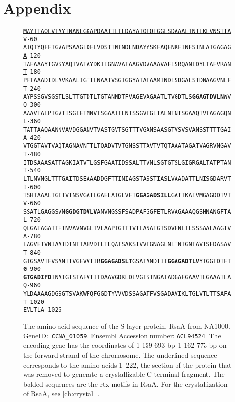 \chapter*{Appendix}
\begin{figure}[p]
  	\begin{center}
\label{app:rsaseq}
\texttt{\singlespacing\small\underline{MAYTTAQLVTAYTNANLGKAPDAATTLTLDAYATQTQTGGLSDAAALTNTLKLVNSTTAV}\hfill-60~~\\
\underline{AIQTYQFFTGVAPSAAGLDFLVDSTTNTNDLNDAYYSKFAQENRFINFSINLATGAGAGA}\hfill-120~\\
\underline{TAFAAAYTGVSYAQTVATAYDKIIGNAVATAAGVDVAAAVAFLSRQANIDYLTAFVRANT}\hfill-180~\\
\underline{PFTAAADIDLAVKAALIGTILNAATVSGIGGYATATAAMI}NDLSDGALSTDNAAGVNLFT\hfill-240~\\
AYPSSGVSGSTLSLTTGTDTLTGTANNDTFVAGEVAGAATLTVGDTLS\textbf{GGAGTDVLN}WVQ\hfill-300~\\
AAAVTALPTGVTISGIETMNVTSGAAITLNTSSGVTGLTALNTNTSGAAQTVTAGAGQNL\hfill-360~\\
TATTAAQAANNVAVDGGANVTVASTGVTSGTTTVGANSAASGTVSVSVANSSTTTTGAIA\hfill-420~\\
VTGGTAVTVAQTAGNAVNTTLTQADVTVTGNSSTTAVTVTQTAAATAGATVAGRVNGAVT\hfill-480~\\
ITDSAAASATTAGKIATVTLGSFGAATIDSSALTTVNLSGTGTSLGIGRGALTATPTANT\hfill-540~\\
LTLNVNGLTTTGAITDSEAAADDGFTTINIAGSTASSTIASLVAADATTLNISGDARVTI\hfill-600~\\
TSHTAAALTGITVTNSVGATLGAELATGLVFT\textbf{GGAGADSILL}GATTKAIVMGAGDDTVTV\hfill-660~\\
SSATLGAGGSVN\textbf{GGDGTDVLV}ANVNGSSFSADPAFGGFETLRVAGAAAQGSHNANGFTAL\hfill-720~\\
QLGATAGATTFTNVAVNVGLTVLAAPTGTTTVTLANATGTSDVFNLTLSSSAALAAGTVA\hfill-780~\\
LAGVETVNIAATDTNTTAHVDTLTLQATSAKSIVVTGNAGLNLTNTGNTAVTSFDASAVT\hfill-840~\\
GTGSAVTFVSANTTVGEVVTIR\textbf{GGAGADSLT}GSATANDTII\textbf{GGAGADTLV}YTGGTDTFT\textbf{G}\hfill-900~\\
\textbf{GTGADIFD}INAIGTSTAFVTITDAAVGDKLDLVGISTNGAIADGAFGAAVTLGAAATLAQ\hfill-960~\\
YLDAAAAGDGSGTSVAKWFQFGGDTYVVVDSSAGATFVSGADAVIKLTGLVTLTTSAFAT\hfill-1020\\
EVLTLA\hfill-1026}
   	\end{center}
   	\caption[RsaA, amino acid sequence]{
   The amino acid sequence of the \ac{S-layer} protein, RsaA from \caulobacter{} NA1000. GeneID:~\texttt{CCNA\_01059}. Ensembl Accession number: \texttt{ACL94524}. The encoding gene has the coordinates of 1 159 693 bp--1 162 773 bp on the forward strand of the \caulobacter chromosome. The underlined sequence corresponds to the amino acids 1--222, the section of the protein that was removed to generate a crystallizable C-terminal fragment. The bolded sequences are the \ac{rtx} motifs in RsaA. For the crystallization of RsaA, see \cref{ch:crystal} .}
   	

\end{figure}
